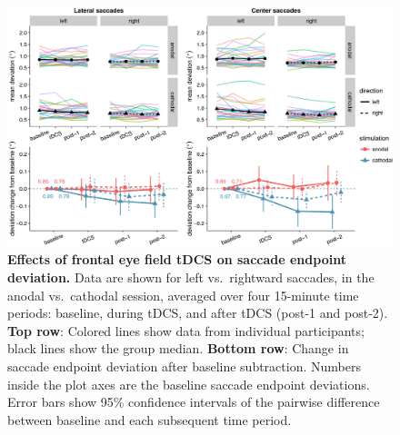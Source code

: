 \documentclass[11pt,]{memoir}
\begin{document}
\begin{figure}
\includegraphics[width=130mm]{sacc_tDCS_files/figures/figure_6_deviation} \caption{\textbf{Effects of frontal eye field tDCS on saccade endpoint deviation.} Data are shown for left vs.~rightward saccades, in the anodal vs.~cathodal session, averaged over four 15-minute time periods: baseline, during tDCS, and after tDCS (post-1 and post-2). \textbf{Top row}: Colored lines show data from individual participants; black lines show the group median. \textbf{Bottom row}: Change in saccade endpoint deviation after baseline subtraction. Numbers inside the plot axes are the baseline saccade endpoint deviations. Error bars show 95\% confidence intervals of the pairwise difference between baseline and each subsequent time period.}\label{fig:fig-deviation}
\end{figure}



\begingroup
\setlength{\LTleft}{-20cm plus -1fill}
\setlength{\LTright}{\LTleft}
\small
\end{document}
